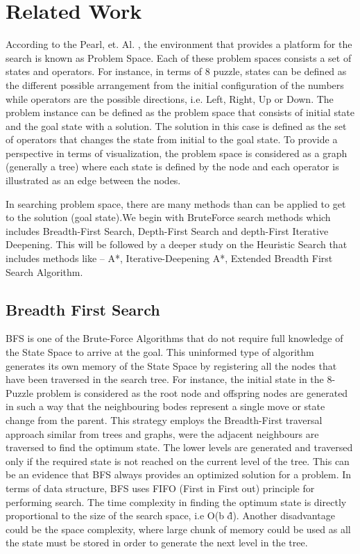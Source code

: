 \documentclass{svproc}
\begin{document}
\section{Related Work}

According to the Pearl, et. Al. , the environment that provides a platform for the search is known as Problem Space. Each of these problem spaces consists a set of states and operators. For instance, in terms of 8 puzzle, states can be defined as the different possible arrangement from the initial configuration of the numbers while operators are the possible directions, i.e. Left, Right, Up or Down. The problem instance can be defined as the problem space that consists of initial state and the goal state with a solution. The solution in this case is defined as the set of operators that changes the state from initial to the goal state. To provide a perspective in terms of visualization, the problem space is considered as a graph (generally a tree) where each state is defined by the node and each operator is illustrated as an edge between the nodes.

In searching problem space, there are many methods than can be applied to get to the solution (goal state).We begin with BruteForce search methods which includes Breadth-First Search, Depth-First Search and depth-First Iterative Deepening. This will be followed by a deeper study on the Heuristic Search that includes methods like – A*, Iterative-Deepening  A*, Extended Breadth First Search Algorithm.
\subsection{Breadth First Search}
BFS is one of the Brute-Force Algorithms that do not require full knowledge of the State Space to arrive at the goal. This uninformed type of algorithm generates its own memory of the State Space by registering all the nodes that have been traversed in the search tree. For instance, the initial state in the 8-Puzzle problem is considered as the root node and offspring nodes are generated in such a way that the neighbouring bodes represent a single move or state change from the parent. This strategy employs the Breadth-First traversal approach similar from trees and graphs, were the adjacent neighbours are traversed to find the optimum state. The lower levels are generated and traversed only if the required state is not reached on the current level of the tree. This can be an evidence that BFS always provides an optimized solution for a problem. In terms of data structure, BFS uses FIFO (First in First out) principle for performing search. The time complexity in finding the optimum state is directly proportional to the size of the search space, i.e O(b \^d). Another disadvantage could be the space complexity, where large chunk of memory could be used as all the state must be stored in order to generate the next level in the tree.
\end{document}
